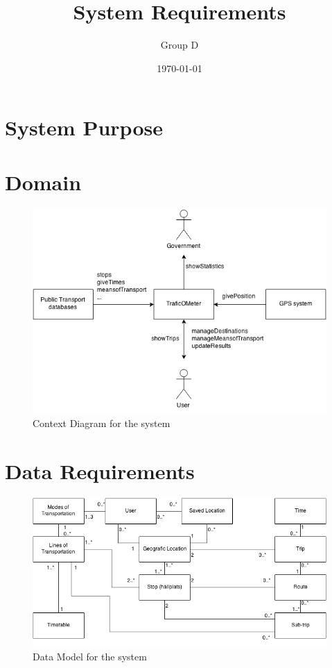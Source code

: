 \documentclass[a4paper]{article}
\title{System Requirements}
\author{Group D}
\date{\today}
\begin{document}
	\maketitle
	\thispagestyle{empty}
	\setcounter{page}{0}
	\pagebreak
	\tableofcontents
	\pagebreak
	

	\section{System Purpose} %
	\section{Domain}
		\begin{figure}[h]
				\includegraphics[scale=0.65]{Context-v1.png}
			\caption{Context Diagram for the system}
		\end{figure}
	\newpage
	\section{Data Requirements}
		\begin{figure}[h]
			\includegraphics[scale=0.50]{Datamodel-v1.png}
			\caption{Data Model for the system}
		\end{figure}	
\end{document}
